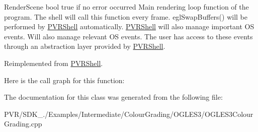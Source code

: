   Render\+Scene  bool true if no error occurred  Main rendering loop function of the program. The shell will call this function every frame. egl\+Swap\+Buffers() will be performed by \hyperlink{class_p_v_r_shell}{P\+V\+R\+Shell} automatically. \hyperlink{class_p_v_r_shell}{P\+V\+R\+Shell} will also manage important O\+S events. Will also manage relevant O\+S events. The user has access to these events through an abstraction layer provided by \hyperlink{class_p_v_r_shell}{P\+V\+R\+Shell}. 

Reimplemented from \hyperlink{class_p_v_r_shell_ae0eb5f797cbe993a22b8659f9c332578}{P\+V\+R\+Shell}.



Here is the call graph for this function\+:




The documentation for this class was generated from the following file\+:\begin{DoxyCompactItemize}
\item 
P\+V\+R/\+S\+D\+K\+\_./\+Examples/\+Intermediate/\+Colour\+Grading/\+O\+G\+L\+E\+S3/O\+G\+L\+E\+S3\+Colour\+Grading.\+cpp\end{DoxyCompactItemize}
